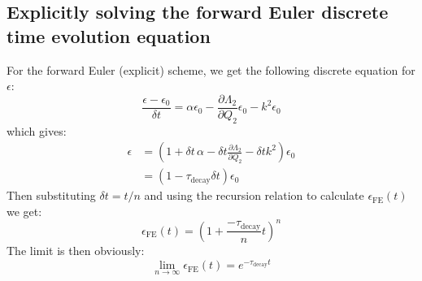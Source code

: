 \documentclass[reqno]{article}
\begin{document}
\subsection{Explicitly solving the forward Euler discrete time evolution equation}
For the forward Euler (explicit) scheme, we get the following discrete equation for $\epsilon$:
\begin{equation}
    \frac{\epsilon - \epsilon_0}{\delta t}
    =
    \alpha \epsilon_0
    - \frac{\partial \Lambda_2}{\partial Q_2} \epsilon_0
    - k^2 \epsilon_0
\end{equation}
which gives:
\begin{equation}
    \begin{split}
        \epsilon
        &=
        \left(
        1 + \delta t \, \alpha
        - \delta t \frac{\partial \Lambda_2}{\partial Q_2}
        - \delta t k^2 
        \right)
        \epsilon_0 \\
        &=
        \left(
        1 - \tau_\text{decay} \delta t
        \right)
        \epsilon_0
    \end{split}
\end{equation}
Then substituting $\delta t = t / n$ and using the recursion relation to calculate $\epsilon_\text{FE}(t)$ we get:
\begin{equation}
    \epsilon_\text{FE}(t)
    =
    \left(
    1 + \frac{-\tau_\text{decay}}{n} t 
    \right)^n
\end{equation}
The limit is then obviously:
\begin{equation}
    \lim_{n \to \infty} 
    \epsilon_\text{FE}(t)
    =
    e^{-\tau_\text{decay} t}
\end{equation}
\end{document}
